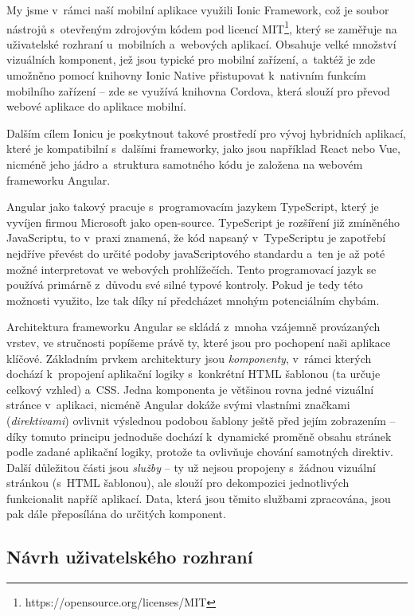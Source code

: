 My jsme v~rámci naší mobilní aplikace využili Ionic Framework, což je
soubor nástrojů s~otevřeným zdrojovým kódem pod licencí
MIT\footnote{https://opensource.org/licenses/MIT}, který se zaměřuje na
uživatelské rozhraní u~mobilních a~webových aplikací. Obsahuje velké
množství vizuálních komponent, jež jsou typické pro mobilní zařízení,
a~taktéž je zde umožněno pomocí knihovny Ionic Native přistupovat
k~nativním funkcím mobilního zařízení -- zde se využívá knihovna Cordova,
která slouží pro převod webové aplikace do aplikace mobilní.
\parencite{cordova}

Dalším cílem Ionicu je poskytnout takové prostředí pro vývoj hybridních
aplikací, které je kompatibilní s~dalšími frameworky, jako jsou
například React nebo Vue, nicméně jeho jádro a~struktura samotného kódu
je založena na webovém frameworku Angular.~\parencite{ionic}

Angular jako takový pracuje s~programovacím jazykem TypeScript, který je
vyvíjen firmou Microsoft jako open-source. TypeScript je rozšíření již
zmíněného JavaScriptu, to v~praxi znamená, že kód napsaný v~TypeScriptu
je zapotřebí nejdříve převést do určité podoby javaScriptového standardu
a~ten je až poté možné interpretovat ve webových prohlížečích. Tento
programovací jazyk se používá primárně z~důvodu své silné typové
kontroly. Pokud je tedy této možnosti využito, lze tak díky ní
předcházet mnohým potenciálním chybám.~\parencite{typescript}

Architektura frameworku Angular se skládá z~mnoha vzájemně provázaných
vrstev, ve stručnosti popíšeme právě ty, které jsou pro pochopení naši
aplikace klíčové. Základním prvkem architektury jsou \emph{komponenty},
v~rámci kterých dochází k~propojení aplikační logiky s~konkrétní HTML
šablonou (ta určuje celkový vzhled) a~CSS. Jedna komponenta je většinou
rovna jedné vizuální stránce v~aplikaci, nicméně Angular dokáže svými
vlastními značkami (\emph{direktivami}) ovlivnit výslednou podobou
šablony ještě před jejím zobrazením -- díky tomuto principu jednoduše
dochází k~dynamické proměně obsahu stránek podle zadané aplikační
logiky, protože ta ovlivňuje chování samotných direktiv. Další důležitou
části jsou \emph{služby} -- ty už nejsou propojeny s~žádnou vizuální
stránkou (s~HTML šablonou), ale slouží pro dekompozici jednotlivých
funkcionalit napříč aplikací. Data, která jsou těmito službami
zpracována, jsou pak dále přeposílána do určitých komponent.
\parencite{angulararchitecture}

\hypertarget{nuxe1vrh-uux17eivatelskuxe9ho-rozhranuxed}{%
\subsection{Návrh uživatelského
rozhraní}\label{nuxe1vrh-uux17eivatelskuxe9ho-rozhranuxed}}

